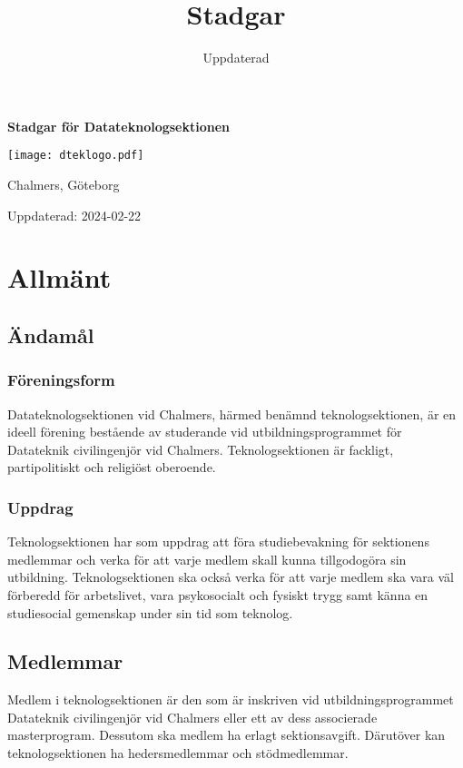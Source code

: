 \documentclass[a4paper]{dtek}
\title{Stadgar}
\date{Uppdaterad \updated}
\newcommand{\updated}{2024-02-22} %
\begin{document}
\makeheadfoot

\vspace*{\fill}
\begin{center}
{\Huge \textbf{Stadgar för Datateknologsektionen}}
\par\bigskip
\texttt{[image: dteklogo.pdf]}
\par\bigskip
{\LARGE Chalmers, Göteborg}
\end{center}
\vspace*{\fill}
\begin{center}
{\LARGE Uppdaterad: \updated}
\end{center}
\vspace*{\fill}

\renewcommand{\thesection}{\S\arabic{section}}

\newpage
\setcounter{tocdepth}{1}
\tableofcontents
\newpage

\section{Allmänt}
\subsection{Ändamål}
\subsubsection{Föreningsform}
Datateknologsektionen vid Chalmers, härmed benämnd teknologsektionen, är en ideell förening bestående av studerande vid utbildningsprogrammet för Datateknik civilingenjör vid Chalmers.
Teknologsektionen är fackligt, partipolitiskt och religiöst oberoende.
\subsubsection{Uppdrag}
Teknologsektionen har som uppdrag att föra studiebevakning för sektionens medlemmar och verka för att varje medlem skall kunna tillgodogöra sin utbildning.
Teknologsektionen ska också verka för att varje medlem ska vara väl förberedd för arbetslivet, vara psykosocialt och fysiskt trygg samt känna en studiesocial gemenskap under sin tid som teknolog.
\subsection{Medlemmar}
Medlem i teknologsektionen är den som är inskriven vid utbildningsprogrammet Datateknik civilingenjör vid Chalmers eller ett av dess associerade masterprogram. Dessutom ska medlem ha erlagt sektionsavgift. Därutöver kan teknologsektionen ha hedersmedlemmar och stödmedlemmar.
\end{document}
